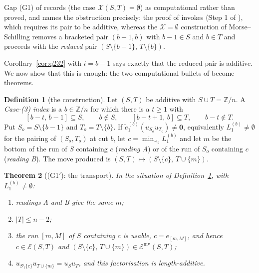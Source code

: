 \documentclass[11pt]{article}
\newtheorem{thm}{Theorem}[section]
\theoremstyle{definition}
\newtheorem{defn}[thm]{Definition}
\newcommand{\Z}{\mathbb{Z}}
\newcommand{\XX}{\mathcal{X}}
\begin{document}
Gap (G1) of \cite{Clio3} records \cite[\S5]{Clio3} (the case $\XX(S,T)=\emptyset$) as
computational rather than proved, and names the obstruction precisely: the proof of
\cite[Thm.~3.2(iii)]{Clio3} invokes \cite[Lem.~3.1]{Clio3} (Step 1 of \cite[Lem.~4.2]{Clio2}),
which requires its pair to be additive, whereas the $\XX=\emptyset$ construction of
Morse--Schilling removes a bracketed pair $(b-1,b)$ with $b-1\in S$ and $b\in T$ and proceeds
with the \emph{reduced} pair $(S\setminus\{b-1\},\,T\setminus\{b\})$.

Corollary~\ref{cor:q232} with $i=b-1$ says exactly that the reduced pair is additive. We now
show that this is enough: the two computational bullets of \cite[\S5]{Clio3} become theorems.

\begin{defn}[the construction]\label{def:case3}
Let $(S,T)$ be additive with $S\cup T=\Z/n$. A \emph{Case-(3) index} is a $b\in\Z/n$ for which
there is a $t\ge1$ with
\[
  [b-t,\,b-1]\subseteq S,\qquad b\notin S,\qquad [b-t+1,\,b]\subseteq T,\qquad b-t\notin T .
\]
Put $S_o=S\setminus\{b-1\}$ and $T_o=T\setminus\{b\}$. If
$\tilde e_1^{(b)}(u_{S_o}u_{T_o})\ne\mathbf 0$, equivalently $L_1^{(b)}\ne\emptyset$ for the
pairing of $(S_o,T_o)$ at cut $b$, let $c=\min_{\prec_b}L_1^{(b)}$ and let $m$ be the bottom of
the run of $S$ containing $c$ (\emph{reading A}) or of the run of $S_o$ containing $c$
(\emph{reading B}). The move produced is $(S,T)\mapsto(S\setminus\{c\},\,T\cup\{m\})$.
\end{defn}

\begin{thm}[(G1$'$): the transport]\label{thm:g1prime}
In the situation of Definition~\ref{def:case3}, with $L_1^{(b)}\ne\emptyset$:
\begin{enumerate}
\item[(1)] readings A and B give the same $m$;
\item[(2)] $|T|\le n-2$;
\item[(3)] the run $[m,M]$ of $S$ containing $c$ is usable, $c=e_{[m,M]}$, and hence
$c\in\mathcal E(S,T)$ and $(S\setminus\{c\},\,T\cup\{m\})\in\mathcal E^{\mathrm{mv}}(S,T)$;
\item[(4)] $u_{S\setminus\{c\}}u_{T\cup\{m\}}=u_Su_T$, and this factorisation is
length-additive.
\end{enumerate}
\end{thm}
\end{document}
